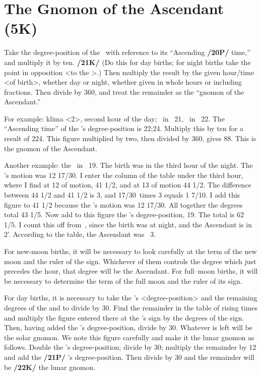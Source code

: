 \section{The Gnomon of the Ascendant (5K)}
Take the degree-position of the \Sun\, with reference to its “Ascending \textbf{/20P/} time,” and multiply it by ten. \textbf{/21K/} (Do this for day births; for night births take the point in opposition <to the \Sun>.) Then multiply the result by the given hour/time <of birth>, whether day or night, whether given in whole hours or including fractions. Then divide by 360, and treat the remainder as the “gnomon of the Ascendant.”

For example: klima <2>, second hour of the day; \Sun\, in \Cancer\, 21\deg, \Moon\, in \Aries\, 22\deg. The “Ascending time” of the \Sun’s degree-position is 22;24. Multiply this by ten for a result of 224. This figure multiplied by two, then divided by 360\deg, gives 88. This is the gnomon of the Ascendant.

Another example: the \Sun\, in \Capricorn\, 19\deg. The birth was in the third hour of the night. The \Moon’s motion was 12 17/30\deg. I enter the column of the table under the third hour, where I find at 12 of motion, 41 1/2, and at 13 of motion 44 1/2. The difference between 44 1/2 and 41 1/2 is 3, and 17/30\deg\, times 3 equals 1 7/10\deg. I add this figure to 41 1/2 because the \Moon’s motion was 12 17/30\deg. All
together the degrees total 43 1/5. Now add to this figure the \Sun’s degree-position, 19\deg. The total is 62 1/5\deg. I count this off from \Cancer\,, since the birth was at night, and the Ascendant is in \Virgo\, 2'.
According to the table, the Ascendant was \Virgo\, 3\deg.

For new-moon births, it will be necessary to look carefully at the term of the new moon and the ruler of the sign. Whichever of them controls the degree which just precedes the hour, that degree will be the Ascendant. For full–moon births, it will be necessary to determine the term of the full moon and the ruler
of its sign.

For day births, it is necessary to take the \Sun’s <degree-position> and the remaining degrees of the \Moon and to divide by 30. Find the remainder in the table of rising times and multiply the figure entered there at the \Sun’s sign by the degrees of the sign. Then, having added the \Sun’s degree-position, divide by 30. Whatever is left will be the solar gnomon. We note this figure carefully and make it the lunar gnomon as follows. Double the \Moon’s degree-position; divide by 30; multiply the remainder by 12 and add the \textbf{/21P/} \Moon’s degree-position. Then divide by 30 and the remainder will be \textbf{/22K/} the lunar gnomon.

